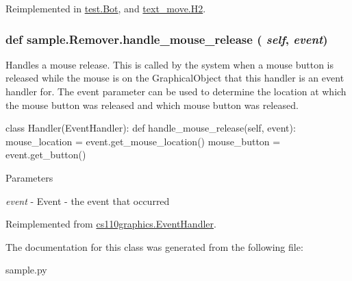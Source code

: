 Reimplemented in \hyperlink{classtest_1_1Bot_a970422a4391cc2b9ff89a2e42063bb6e}{test.Bot}, and \hyperlink{classtext__move_1_1H2_a13611a7fe23eefc92b40ff3874e026bd}{text\_\-move.H2}.\hypertarget{classsample_1_1Remover_a84484de500f08402e582c126432e0cf1}{
\subsubsection[{handle\_\-mouse\_\-release}]{\setlength{\rightskip}{0pt plus 5cm}def sample.Remover.handle\_\-mouse\_\-release ( {\em self}, \/   {\em event})}}
\label{classsample_1_1Remover_a84484de500f08402e582c126432e0cf1}


Handles a mouse release. This is called by the system when a mouse button is released while the mouse is on the GraphicalObject that this handler is an event handler for. The event parameter can be used to determine the location at which the mouse button was released and which mouse button was released. 
\begin{DoxyCode}
 class Handler(EventHandler):
     def handle_mouse_release(self, event):
         mouse_location = event.get_mouse_location()
         mouse_button = event.get_button()
\end{DoxyCode}
 
\begin{DoxyParams}{Parameters}
\item[{\em event}]-\/ Event -\/ the event that occurred \end{DoxyParams}


Reimplemented from \hyperlink{classcs110graphics_1_1EventHandler_a320a7dbf68d37e0101b237bff1713088}{cs110graphics.EventHandler}.

The documentation for this class was generated from the following file:\begin{DoxyCompactItemize}
\item 
sample.py\end{DoxyCompactItemize}
